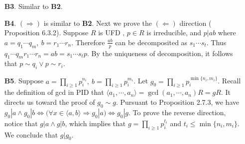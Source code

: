 \begin{enumerate}
    
    \item[\textbf{B3}.] Similar to \textbf{B2}.
    \item[\textbf{B4}.] $(\Rightarrow)$ is similar to  \textbf{B2}. Next we prove the $(\Leftarrow)$ direction (\cite{LWW_AJN} Proposition 6.3.2). Suppose $R$ is UFD , $p \in R$ is irreducible, and $p | ab$ where $a = q_1 \cdots q_m, \ b = r_1\cdots r_n$. Therefore $\frac{ab}{p}$ can be decomposited as $s_1 \cdots s_t$. Thus $q_1 \cdots q_m r_1\cdots r_n = ab = s_1 \cdots s_t p$. By the uniqueness of decomposition, it follows that $p \sim q_i \lor p \sim r_i$. 
    \item[\textbf{B5}.] Suppose $a = \prod_{i \geq 1} p_i^{n_i}, \ b = \prod_{i\geq 1} p_i^{m_i}$. Let $g_0 = \prod_{i \geq 1} p_i^{\min\{ n_i, m_i \}}$. Recall the definition of gcd in PID that $\langle a_1 , \cdots, a_n \rangle = \gcd(a_1, \cdots, a_n) R = gR$. It directs us toward the proof of $g_0 \sim g$. Pursuant to \cite{LWW_AJN} Proposition 2.7.3, we have $g_0|a \land g_0 | b \Leftrightarrow (\forall x \in \langle a, b \rangle \Rightarrow g_0 | a ) \Leftrightarrow g_0 | g$. To prove the reverse direction, notice that $g | a \land g | b$, which implies that $g = \prod_{i\geq 1} p_i^{t_i}$ and $t_i \leq \min\{ n_i, m_i \}$. We conclude that $g | g_0$.
\end{enumerate}

